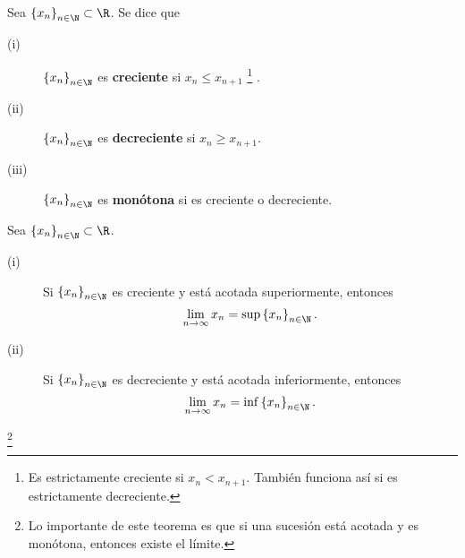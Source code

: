 \begin{fdefinition}[Monotonía]
	\normalfont Sea $\displaystyle \left\{ x_{n}\right\} _{n\in\N} \subset \R$. Se dice que 
	\begin{description}
		\item[(i)] $\displaystyle \left\{ x_{n}\right\} _{n\in\N} $ es \textbf{creciente} si $\displaystyle x_{n} \leq x_{n+1} $ \footnote{Es estrictamente creciente si $\displaystyle x_{n} < x_{n+1} $. También funciona así si es estrictamente decreciente.} .
		\item[(ii)] $\displaystyle \left\{ x_{n}\right\} _{n\in\N} $ es \textbf{decreciente} si $\displaystyle x_{n}\geq x_{n+1} $.
		\item[(iii)] $\displaystyle \left\{ x_{n}\right\} _{n\in\N} $ es \textbf{monótona} si es creciente o decreciente.
	\end{description}
\end{fdefinition}

\begin{ftheorem}[]
	\normalfont Sea $\displaystyle \left\{ x_{n}\right\} _{n\in\N} \subset \R$. 
	\begin{description}
		\item[(i)] Si $\displaystyle \left\{ x_{n}\right\} _{n\in\N} $ es creciente y está acotada superiormente, entonces 
			\[\lim_{n \to \infty}x_{n} = \sup \left\{ x_{n}\right\} _{n\in\N} .\]
		\item[(ii)] Si $\displaystyle \left\{ x_{n}\right\} _{n\in\N} $ es decreciente y está acotada inferiormente, entonces
			\[\lim_{n \to \infty}x_{n} = \inf \left\{ x_{n}\right\} _{n\in\N} .\]	
	\end{description}
\footnote{Lo importante de este teorema es que si una sucesión está acotada y es monótona, entonces existe el límite.} 
\end{ftheorem}

